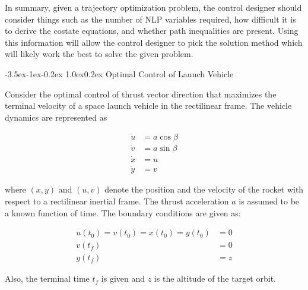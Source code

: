\documentclass[11pt,letterpaper,onecolumn,notitlepage]{article}
\makeatletter
\renewcommand\section{\@startsection{section}{1}{\z@}%
{-3.5ex\@plus-1ex\@minus-0.2ex}%
{1.0ex\@plus0.2ex}%
{\fontsize{12pt}{12pt}\selectfont\bfseries\sffamily}}
\makeatother
\begin{document}
  In summary, given a trajectory optimization problem, the control designer should consider things such as the number of NLP variables required, how difficult it is to derive the costate equations, and whether path inequalities are present.
  Using this information will allow the control designer to pick the solution method which will likely work the best to solve the given problem.


  \clearpage
  \section{Optimal Control of Launch Vehicle}

  Consider the optimal control of thrust vector direction that maximizes the terminal velocity of a space launch vehicle in the rectilinear frame.
  The vehicle dynamics are represented as

  \begin{align*}
    \dot{u} &= a\cos\beta \\
    \dot{v} &= a\sin\beta \\
    \dot{x} &= u \\
    \dot{y} &= v
  \end{align*}

  where $(x,y)$ and $(u,v)$ denote the position and the velocity of the rocket with respect to a rectilinear inertial frame.
  The thrust acceleration $a$ is assumed to be a known function of time.
  The boundary conditions are given as:

  \begin{align*}
    u(t_{0})=v(t_{0})=x(t_{0})=y(t_{0}) &= 0 \\
    v(t_{f})                            &= 0 \\
    y(t_{f})                            &= z
  \end{align*}

  Also, the terminal time $t_{f}$ is given and $z$ is the altitude of the target orbit.
\end{document}
